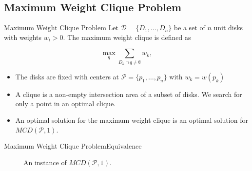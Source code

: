 \documentclass{beamer}
\newcommand{\D}{\mathscr{D}}
\newcommand{\Pp}{\mathscr{P}}
\begin{document}
\subsection{Maximum Weight Clique Problem}
\begin{frame}{Maximum Weight Clique Problem}
	Let $\D=\{D_1,\dots,D_n\}$ be a set of $n$ unit disks with weights $w_i>0$. The maximum weight clique is defined as
	
	\begin{equation*}
	\max_q \sum_{D_k \cap q \neq \emptyset} w_k,
	\end{equation*}
	
	\begin{itemize}
		\item The disks are fixed with centers at $\Pp =\{p_1,\dots,p_n\}$ with $w_k=w(p_k)$
		\item A clique is a non-empty intersection area of a subset of disks. We search for only a point in an optimal clique.
		\item An optimal solution for the maximum weight clique is an optimal solution for $MCD(\Pp,1)$.
	\end{itemize}
\end{frame}

\begin{frame}{Maximum Weight Clique Problem}{Equivalence}
		\begin{figure}[H]
		\centering
		
		\caption{An instance of $MCD(\Pp,1)$.}
		\label{fig:mcd_instance}
	\end{figure}
\end{frame}
\end{document}
